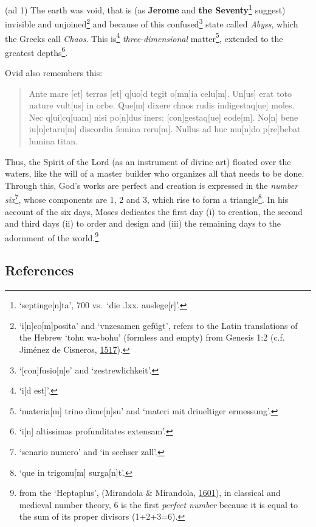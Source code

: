 \documentclass[
]{article}
\begin{document}
(ad 1) The earth was void, that is (as \textbf{Jerome} and \textbf{the
Seventy}\footnote{`septinge{[}n{]}ta', 700 vs.~`die .lxx.
  auslege{[}r{]}'.} suggest) invisible and unjoined\footnote{`i{[}n{]}co{[}m{]}posita'
  and `vnzesamen gefügt', refers to the Latin translations of the Hebrew
  `tohu wa-bohu' (formless and empty) from Genesis 1:2 (c.f. Jiménez de
  Cisneros, \href{https://doi.org/10.3931/e-rara-46695}{1517}).} and
because of this confused\footnote{`{[}con{]}fusio{[}n{]}e' and
  `zestrewlichkeit'.} state called \emph{Abyss}, which the Greeks call
\emph{Chaos}. This is\footnote{`i{[}d est{]}'.} \emph{three-dimensional}
matter\footnote{`materia{[}m{]} trino dime{[}n{]}su' and `materi mit
  driueltiger ermessung'.}, extended to the greatest depths\footnote{`i{[}n{]}
  altissimas profunditates extensam'.}.

Ovid also remembers this:

\begin{quote}
Ante mare {[}et{]} terras {[}et{]} q{[}uo{]}d tegit o{[}mn{]}ia
celu{[}m{]}. Un{[}us{]} erat toto nature vult{[}us{]} in orbe.
Que{[}m{]} dixere chaos rudis indigestaq{[}ue{]} moles. Nec
q{[}ui{]}cq{[}uam{]} nisi po{[}n{]}dus iners: {[}con{]}gestaq{[}ue{]}
eode{[}m{]}. No{[}n{]} bene iu{[}n{]}ctaru{[}m{]} discordia femina
reru{[}m{]}. Nullus ad huc mu{[}n{]}do p{[}re{]}bebat lumina titan.
\end{quote}

Thus, the Spirit of the Lord (as an instrument of divine art) floated
over the waters, like the will of a master builder who organizes all
that needs to be done. Through this, God's works are perfect and
creation is expressed in the \emph{number six}\footnote{`senario numero'
  and `in sechser zall'.}, whose components are 1, 2 and 3, which rise
to form a triangle\footnote{`que in trigonu{[}m{]} surga{[}n{]}t'.}. In
his account of the six days, Moses dedicates the first day (i) to
creation, the second and third days (ii) to order and design and (iii)
the remaining days to the adornment of the world.\footnote{from the
  `Heptaplus', (Mirandola \& Mirandola,
  \href{https://doi.org/10.3931/e-rara-61217}{1601}), in classical and
  medieval number theory, 6 is the first \emph{perfect number} because
  it is equal to the sum of its proper divisors (1+2+3=6).}

\hypertarget{references}{%
\subsection{References}\label{references}}
\end{document}
